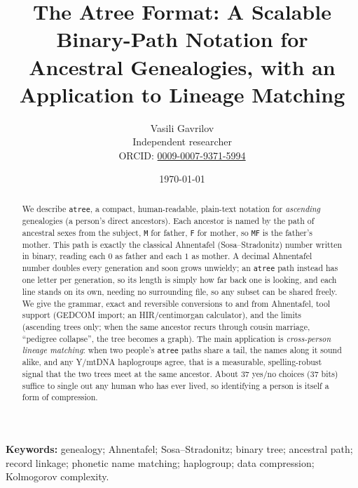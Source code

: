 \documentclass[11pt]{article}
\title{The Atree Format: A Scalable Binary-Path Notation for\\ Ancestral Genealogies, with an Application to Lineage Matching}
\author{Vasili Gavrilov\\
\small Independent researcher\\
\small ORCID: \href{https://orcid.org/0009-0007-9371-5994}{0009-0007-9371-5994}}
\date{\today}
\newcommand{\atree}{\texttt{atree}}
\begin{document}
\maketitle

\begin{abstract}
We describe \atree, a compact, human-readable, plain-text notation for \emph{ascending}
genealogies (a person's direct ancestors). Each ancestor is named by the path of ancestral sexes
from the subject, \texttt{M} for father, \texttt{F} for mother, so \texttt{MF} is the father's
mother. This path is exactly the classical Ahnentafel (Sosa--Stradonitz) number written in binary,
reading each $0$ as father and each $1$ as mother. A decimal Ahnentafel number doubles every
generation and soon grows unwieldy; an \atree{} path instead has one letter per generation, so its
length is simply how far back one is looking, and each line stands on its own, needing no surrounding
file, so any subset can be shared freely. We give the grammar, exact and reversible conversions to
and from Ahnentafel, tool support (GEDCOM import; an HIR/centimorgan calculator), and the limits
(ascending trees only; when the same ancestor recurs through cousin marriage, ``pedigree collapse'',
the tree becomes a graph). The main application is \emph{cross-person lineage matching}: when two
people's \atree{} paths share a tail, the names along it sound alike, and any Y/mtDNA haplogroups
agree, that is a measurable, spelling-robust signal that the two trees meet at the same ancestor.
About $37$ yes/no choices ($37$ bits) suffice to single out any human who has ever lived, so
identifying a person is itself a form of compression.
\end{abstract}

\noindent\textbf{Keywords:} genealogy; Ahnentafel; Sosa--Stradonitz; binary tree; ancestral path;
record linkage; phonetic name matching; haplogroup; data compression; Kolmogorov complexity.
\end{document}
